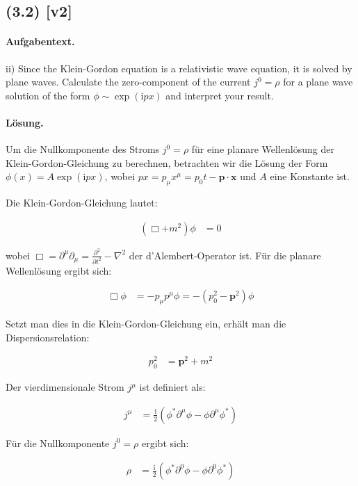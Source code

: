 \documentclass[11pt,a4paper]{article}
\begin{document}
\subsection*{(3.2) [v2]}
\paragraph{Aufgabentext.}
ii) Since the Klein-Gordon equation is a relativistic wave equation, it is solved by plane waves. Calculate the zero-component of the current $j^0=\rho$ for a plane wave solution of the form $\phi \sim \exp (\mathrm{i} p x)$ and interpret your result.

\paragraph{Lösung.}
Um die Nullkomponente des Stroms $j^0 = \rho$ für eine planare Wellenlösung der Klein-Gordon-Gleichung zu berechnen, betrachten wir die Lösung der Form $\phi(x) = A \exp(\mathrm{i} p x)$, wobei $p x = p_\mu x^\mu = p_0 t - \mathbf{p} \cdot \mathbf{x}$ und $A$ eine Konstante ist.

Die Klein-Gordon-Gleichung lautet:

\begin{align*}
(\Box + m^2) \phi &= 0
\end{align*}

wobei $\Box = \partial^\mu \partial_\mu = \frac{\partial^2}{\partial t^2} - \nabla^2$ der d'Alembert-Operator ist. Für die planare Wellenlösung ergibt sich:

\begin{align*}
\Box \phi &= -p_\mu p^\mu \phi = -(p_0^2 - \mathbf{p}^2) \phi
\end{align*}

Setzt man dies in die Klein-Gordon-Gleichung ein, erhält man die Dispersionsrelation:

\begin{align*}
p_0^2 &= \mathbf{p}^2 + m^2
\end{align*}

Der vierdimensionale Strom $j^\mu$ ist definiert als:

\begin{align*}
j^\mu &= \frac{\mathrm{i}}{2} \left( \phi^* \partial^\mu \phi - \phi \partial^\mu \phi^* \right)
\end{align*}

Für die Nullkomponente $j^0 = \rho$ ergibt sich:

\begin{align*}
\rho &= \frac{\mathrm{i}}{2} \left( \phi^* \partial^0 \phi - \phi \partial^0 \phi^* \right)
\end{align*}
\end{document}
